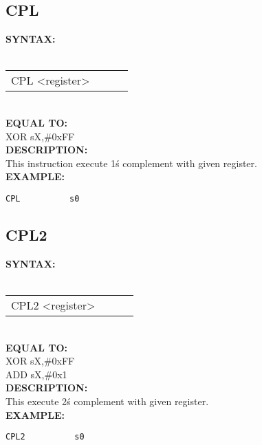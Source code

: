 {                \subsection{CPL}
                \textbf{SYNTAX:}\\
                \\ {
                    \texttt{}
                    \begin{tabular}[h!]{llll}
                            { \color{highlight_instruction} CPL    } { \color{highlight_symbol} <register> }
                            { \color{highlight_comment}  }\\
                    \end{tabular}
                    }\\
                    \textbf{EQUAL TO:}\\
                    { \color{highlight_instruction} XOR    } { \color{highlight_symbol}      sX,\#0xFF }
                    \\
                \textbf{DESCRIPTION:}\\
                This instruction execute 1\'s complement with given register.\\
                \textbf{EXAMPLE:}\\
                        \begin{code}[h!]
                            {\color{highlight_symbol}\verb'CPL          s0' }\\
                        \end{code}
                \subsection{CPL2}
                \textbf{SYNTAX:}\\
                \\ {
                    \texttt{}
                    \begin{tabular}[h!]{llll}
                            { \color{highlight_instruction} CPL2    } { \color{highlight_symbol} <register> }
                            { \color{highlight_comment}  }\\
                    \end{tabular}
                    }\\
                    \textbf{EQUAL TO:}\\
                    { \color{highlight_instruction} XOR    } { \color{highlight_symbol}      sX,\#0xFF }\\
                    { \color{highlight_instruction} ADD    } { \color{highlight_symbol}      sX,\#0x1 }\\
                \textbf{DESCRIPTION:}\\
                This execute 2\'s complement with given register.\\
                \textbf{EXAMPLE:}\\
                        \begin{code}[h!]
                            {\color{highlight_symbol}\verb'CPL2          s0' }\\
                        \end{code}

}

